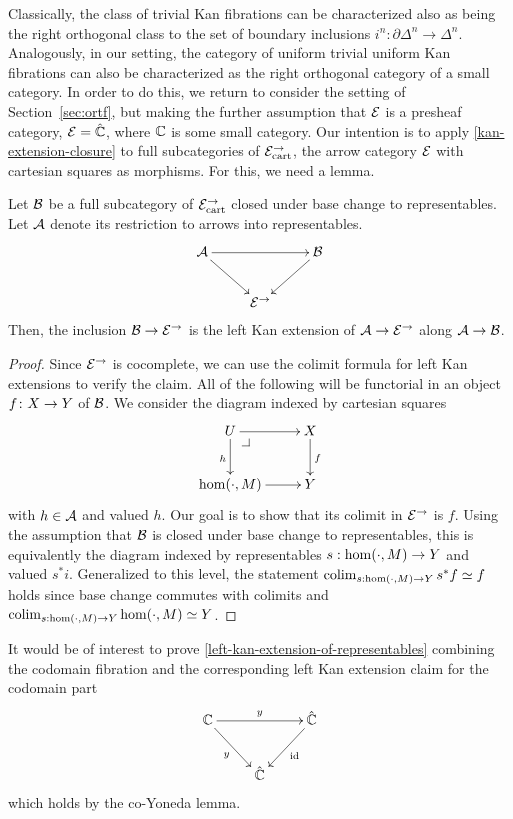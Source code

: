 \documentclass[reqno,10pt,a4paper,oneside]{amsart}
\begin{document}
 Classically, the class of trivial Kan fibrations can be characterized also as being the right orthogonal class to the
set of boundary inclusions $i^n : \partial \Delta^n \to \Delta^n$. Analogously, in our setting, the category of uniform trivial uniform
Kan fibrations can also be characterized as the right orthogonal category of  a small category.
In order to do this, we return to consider the setting of Section~\ref{sec:ortf}, but making the
further assumption that $\catE$ is a presheaf category, \ie $\catE = \hat{\cat{C}}$, where $\catC$ is some small category. Our intention is to apply \cref{kan-extension-closure} to full subcategories of $\catE_{\cart}^{\to}$, the arrow category $\catE$ with cartesian squares as morphisms. For this, we need a lemma.

\begin{lemma}
\label{left-kan-extension-of-representables}
Let $\cal{B}$ be a full subcategory of $\catE_{\cart}^{\to}$ closed under base change to representables.
Let $\cal{A}$ denote its restriction to arrows into representables.
\[
\xymatrix{
  \cal{A}
  \ar[rr]
  \ar[dr]
&&
  \cal{B}
  \ar[dl]
\\&
  \catE^{\to}
}
\]
Then, the inclusion $\cal{B} \to \catE^{\to}$ is the left Kan extension of $\cal{A} \to \catE^{\to}$ along $\cal{A} \to \cal{B}$.
\end{lemma}


\begin{proof}
Since $\catE^{\to}$ is cocomplete, we can use the colimit formula for left Kan extensions to verify the claim.
All of the following will be functorial in an object $f \co X \to Y$ of $\cal{B}$.
We consider the diagram indexed by cartesian squares
\[
\xymatrix{
  U
  \ar[r]
  \ar[d]_{h}
  \pullback{dr}
&
  X
  \ar[d]^{f}
\\
  \hom(\arghole, M)
  \ar[r]
&
  Y
}
\]
with $h \in \cal{A}$ and valued $h$.
Our goal is to show that its colimit in $\catE^{\to}$ is $f$.
Using the assumption that $\cal{B}$ is closed under base change to representables, this is equivalently the diagram indexed by representables $s : \hom(\arghole, M) \to Y$ and valued $s^* i$.
Generalized to this level, the statement $\colim_{s : \hom(\arghole, M) \to Y} s^* f \simeq f$ holds since base change commutes with colimits and 
$\colim_{s : \hom(\arghole, M) \to Y} \hom(\arghole, M) \simeq Y$.
\end{proof}


\begin{remark} It would be of interest to prove \cref{left-kan-extension-of-representables} combining 
the codomain fibration and the corresponding left Kan extension claim for the codomain part
\[
\xymatrix{
  \cat{C}
  \ar[rr]^{y}
  \ar[dr]_{y}
&&
  \hat{\catC}
  \ar[dl]^{\id}
\\&
  \hat{\cat{C}}
}
\]
which holds by the co-Yoneda lemma.
\end{remark}
\end{document}
